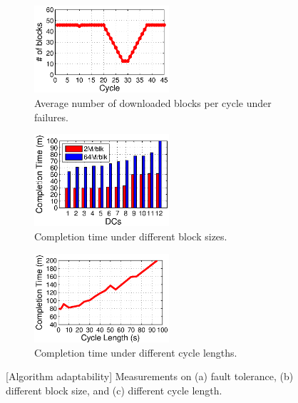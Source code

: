 \begin{figure}[t]
        \centering
        \begin{subfigure}[b]{0.3\textwidth}
                \centering
                \includegraphics[width=50mm]{images/failure.eps}%
                \caption{Average number of downloaded blocks per cycle under failures.}
                \label{fig:analysis:failure}
        \end{subfigure}
        \begin{subfigure}[b]{0.3\textwidth}
                \centering
                \includegraphics[width=50mm]{images/blkSize.eps} %
                \caption{Completion time under different block sizes.}
                \label{fig:analysis:blksize}
        \end{subfigure}
        \begin{subfigure}[b]{0.3\textwidth}
                \centering
                \includegraphics[width=50mm]{images/cycleDiff.eps}%
                \caption{Completion time under different cycle lengths.}
                \label{fig:analysis:cycleDiff}
        \end{subfigure}
        \caption{[Algorithm adaptability] Measurements on (a) fault tolerance, (b) different block size, and (c) different cycle length.}
        \label{fig:analysis}
\vspace{-0.4cm}
\end{figure}

